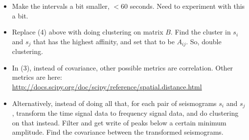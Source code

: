 \documentclass[a4paper, 11pt]{article} %
\begin{document}
\begin{itemize}
    \item Make the intervals a bit smaller, $<60$ seconds. Need to experiment with this a bit.

    \item Replace (4) above with doing clustering on matrix $B$. Find the cluster in $s_i$ and $s_j$ that has the highest affinity, and set that to be $A_{ij}$. So, double clustering. 

    \item In (3), instead of covariance, other possible metrics are correlation. Other metrics are here: \url{http://docs.scipy.org/doc/scipy/reference/spatial.distance.html}

	\item Alternatively, instead of doing all that, for each pair of seismograms $s_i$ and $s_j$, transform the time signal data to frequency signal data, and do clustering on that instead. Filter and get write of peaks below a certain minimum amplitude. Find the covariance between the transformed seismograms.
\end{itemize}






\end{document}
